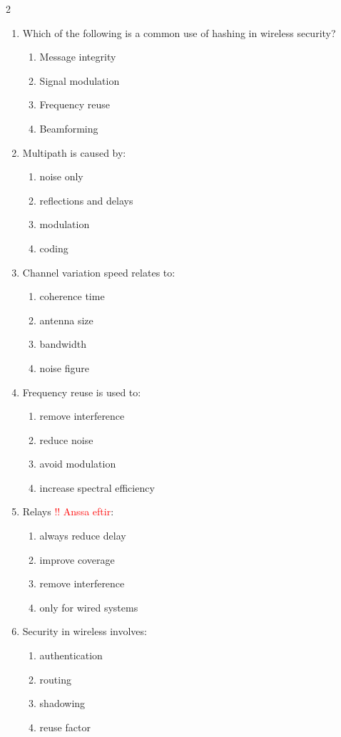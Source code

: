 \begin{multicols}{2}
\begin{enumerate}[leftmargin=*, itemsep=0.4em]
\item Which of the following is a common use of hashing in wireless security?
\begin{enumerate}[label=\alph*)]
\item Message integrity
\item Signal modulation
\item Frequency reuse
\item Beamforming
\end{enumerate}

\item Multipath is caused by:
\begin{enumerate}[label=\alph*)]
\item noise only
\item reflections and delays
\item modulation
\item coding
\end{enumerate}

\item Channel variation speed relates to:
\begin{enumerate}[label=\alph*)]
\item coherence time
\item antenna size
\item bandwidth
\item noise figure
\end{enumerate}

\item Frequency reuse is used to:
\begin{enumerate}[label=\alph*)]
\item remove interference
\item reduce noise
\item avoid modulation
\item increase spectral efficiency
\end{enumerate}

\item Relays \textcolor{red}{!! Anssa eftir}:
\begin{enumerate}[label=\alph*)]
\item always reduce delay
\item improve coverage
\item remove interference
\item only for wired systems
\end{enumerate}

\item Security in wireless involves:
\begin{enumerate}[label=\alph*)]
\item authentication
\item routing
\item shadowing
\item reuse factor
\end{enumerate}


\end{enumerate}
\end{multicols}
